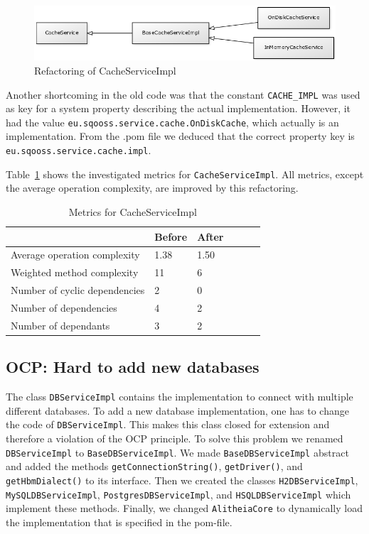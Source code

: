\documentclass{article}
\begin{document}
\begin{figure}[h]
    \centering
    \includegraphics[width=1\textwidth]{cacheservice}
    \caption{Refactoring of CacheServiceImpl}
    \label{fig:cacheservice}
\end{figure}

Another shortcoming in the old code was that the constant \verb|CACHE_IMPL| was used as key for a system property describing the actual implementation. However, it had the value \texttt{eu\allowbreak.sqooss.service.cache.OnDiskCache}, which actually is an implementation. From the .pom file we deduced that the correct property key is \verb|eu.sqooss.service.cache.impl|.

Table~\ref{tbl:cacheserviceimpl} shows the investigated metrics for \verb|CacheServiceImpl|. All metrics, except the average operation complexity, are improved by this refactoring.

\begin{table}[h]
	\centering
    \begin{tabular}{l|llll}
    ~                                 & Before & After & ~ & ~ \\ \hline
    Average operation complexity      & 1.38 & 1.50 \\
    Weighted method complexity        & 11   & 6 \\
    Number of cyclic dependencies     & 2    & 0 \\
    Number of dependencies            & 4    & 2 \\
    Number of dependants              & 3    & 2 \\
    \end{tabular}
    \caption{Metrics for CacheServiceImpl}
    \label{tbl:cacheserviceimpl}
\end{table}

\subsection{OCP: Hard to add new databases}
The class \verb|DBServiceImpl| contains the implementation to connect with multiple different databases. To add a new database implementation, one has to change the code of \verb|DBServiceImpl|. This makes this class closed for extension and therefore a violation of the OCP principle.
To solve this problem we renamed \verb|DBServiceImpl| to \verb|BaseDBServiceImpl|. We made \verb|BaseDBServiceImpl| abstract and added the methods \verb|getConnectionString()|, \verb|getDriver()|, and \verb|getHbmDialect()| to its interface. Then we created the classes \verb|H2DBServiceImpl|, \verb|MySQLDBServiceImpl|, \verb|PostgresDBServiceImpl|, and \verb|HSQLDBServiceImpl| which implement these methods. Finally, we changed \verb|AlitheiaCore| to dynamically load the implementation that is specified in the pom-file.
\end{document}
